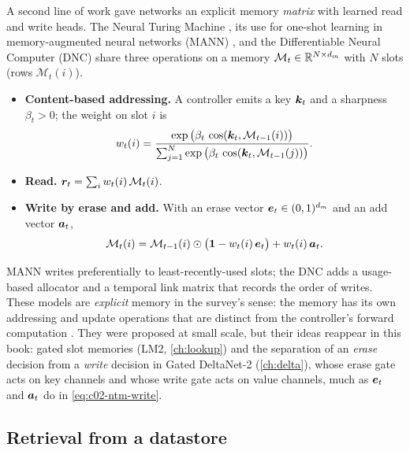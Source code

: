 A second line of work gave networks an explicit memory \emph{matrix} with learned read and write
heads. The Neural Turing Machine \citep{c02-graves2014ntm}, its use for one-shot learning in
memory-augmented neural networks (MANN) \citep{santoro2016mann}, and the Differentiable Neural
Computer (DNC) \citep{graves2016dnc} share three operations on a memory
$\mathcal{M}_t \in \mathbb{R}^{N \times d_m}$ with $N$ slots (rows $\mathcal{M}_t(i)$).
\begin{itemize}
  \item \textbf{Content-based addressing.} A controller emits a key $\bm{k}_t$ and a sharpness
        $\beta_t > 0$; the weight on slot $i$ is
        \begin{equation}\label{eq:c02-ntm-address}
          w_t(i) = \frac{\exp\big(\beta_t\,\cos(\bm{k}_t, \mathcal{M}_{t-1}(i))\big)}
                        {\sum_{j=1}^{N}\exp\big(\beta_t\,\cos(\bm{k}_t, \mathcal{M}_{t-1}(j))\big)}.
        \end{equation}
  \item \textbf{Read.} $\bm{r}_t = \sum_i w_t(i)\,\mathcal{M}_t(i)$.
  \item \textbf{Write by erase and add.} With an erase vector $\bm{e}_t \in (0,1)^{d_m}$ and an add
        vector $\bm{a}_t$,
        \begin{equation}\label{eq:c02-ntm-write}
          \mathcal{M}_t(i) = \mathcal{M}_{t-1}(i) \odot \big(\mathbf{1} - w_t(i)\,\bm{e}_t\big)
                             + w_t(i)\,\bm{a}_t .
        \end{equation}
\end{itemize}
MANN writes preferentially to least-recently-used slots; the DNC adds a usage-based allocator
and a temporal link matrix that records the order of writes. These models are \emph{explicit}
memory in the survey's sense: the memory has its own addressing and update operations that are
distinct from the controller's forward computation \citep[\S IV-A]{zhoubian2026memory}. They were
proposed at small scale, but their ideas reappear in this book: gated slot memories (LM2,
\cref{ch:lookup}) and the separation of an \emph{erase} decision from a \emph{write} decision in
Gated DeltaNet-2 (\cref{ch:delta}), whose erase gate acts on key channels and whose write gate acts
on value channels, much as $\bm{e}_t$ and $\bm{a}_t$ do in \eqref{eq:c02-ntm-write}.

\subsection{Retrieval from a datastore}\label{sec:c02-retrieval}

